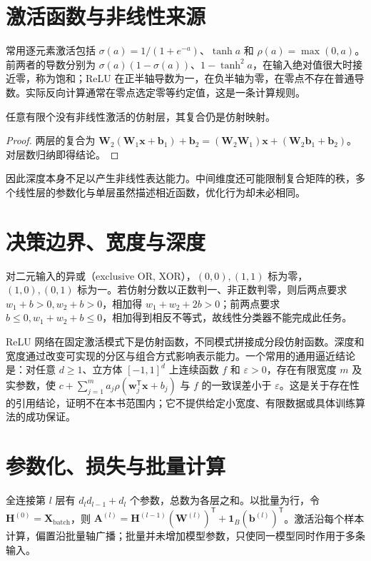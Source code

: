 \documentclass[UTF8,12pt,a4paper,fontset=fandol]{ctexbook}
\begin{document}
\section{激活函数与非线性来源}
常用逐元素激活包括 $\sigma(a)=1/(1+e^{-a})$、$\tanh a$ 和 $\rho(a)=\max(0,a)$。前两者的导数分别为 $\sigma(a)(1-\sigma(a))$、$1-\tanh^2a$，在输入绝对值很大时接近零，称为饱和；ReLU 在正半轴导数为一，在负半轴为零，在零点不存在普通导数。实际反向计算通常在零点选定零等约定值，这是一条计算规则。

\begin{proposition}[仿射层的合并]
任意有限个没有非线性激活的仿射层，其复合仍是仿射映射。
\end{proposition}
\begin{proof}
两层的复合为 $\mathbf W_2(\mathbf W_1\mathbf x+\mathbf b_1)+\mathbf b_2=(\mathbf W_2\mathbf W_1)\mathbf x+(\mathbf W_2\mathbf b_1+\mathbf b_2)$。对层数归纳即得结论。
\end{proof}
因此深度本身不足以产生非线性表达能力。中间维度还可能限制复合矩阵的秩，多个线性层的参数化与单层虽然描述相近函数，优化行为却未必相同。

\section{决策边界、宽度与深度}
对二元输入的异或（exclusive OR, XOR），$(0,0),(1,1)$ 标为零，$(1,0),(0,1)$ 标为一。若仿射分数以正数判一、非正数判零，则后两点要求 $w_1+b>0,w_2+b>0$，相加得 $w_1+w_2+2b>0$；前两点要求 $b\leq0,w_1+w_2+b\leq0$，相加得到相反不等式，故线性分类器不能完成此任务。

ReLU 网络在固定激活模式下是仿射函数，不同模式拼接成分段仿射函数。深度和宽度通过改变可实现的分区与组合方式影响表示能力。一个常用的通用逼近结论是：对任意 $d\geq1$、立方体 $[-1,1]^d$ 上连续函数 $f$ 和 $\varepsilon>0$，存在有限宽度 $m$ 及实参数，使 $c+\sum_{j=1}^ma_j\rho(\mathbf w_j^\mathsf T\mathbf x+b_j)$ 与 $f$ 的一致误差小于 $\varepsilon$。这是关于存在性的引用结论，证明不在本书范围内；它不提供给定小宽度、有限数据或具体训练算法的成功保证。

\section{参数化、损失与批量计算}
全连接第 $l$ 层有 $d_ld_{l-1}+d_l$ 个参数，总数为各层之和。以批量为行，令 $\mathbf H^{(0)}=\mathbf X_{\mathrm{batch}}$，则 $\mathbf A^{(l)}=\mathbf H^{(l-1)}(\mathbf W^{(l)})^\mathsf T+\mathbf1_B(\mathbf b^{(l)})^\mathsf T$。激活沿每个样本计算，偏置沿批量轴广播；批量并未增加模型参数，只使同一模型同时作用于多条输入。
\end{document}
